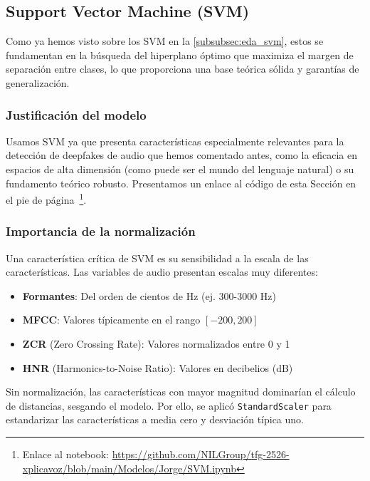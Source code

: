 \subsection{Support Vector Machine (SVM)}
\label{subsubsec:mod_svm}

Como ya hemos visto sobre los SVM en la \autoref{subsubsec:eda_svm}, estos se fundamentan en la búsqueda del hiperplano óptimo que maximiza el margen de separación entre clases, lo que proporciona una base teórica sólida y garantías de generalización.

\subsubsection*{Justificación del modelo}

Usamos SVM ya que presenta características especialmente relevantes para la detección de deepfakes de audio que hemos comentado antes, como la eficacia en espacios de alta dimensión (como puede ser el mundo del lenguaje natural) o su fundamento teórico robusto. Presentamos un enlace al código de esta Sección en el pie de página~\footnote{Enlace al notebook: \url{https://github.com/NILGroup/tfg-2526-xplicavoz/blob/main/Modelos/Jorge/SVM.ipynb}}.

\subsubsection*{Importancia de la normalización}

Una característica crítica de SVM es su sensibilidad a la escala de las características. Las variables de audio presentan escalas muy diferentes:

\begin{itemize}
    \item \textbf{Formantes}: Del orden de cientos de Hz (ej. 300-3000 Hz)
    \item \textbf{MFCC}: Valores típicamente en el rango \([-200, 200]\)
    \item \textbf{ZCR} (Zero Crossing Rate): Valores normalizados entre 0 y 1
    \item \textbf{HNR} (Harmonics-to-Noise Ratio): Valores en decibelios (dB)
\end{itemize}

Sin normalización, las características con mayor magnitud dominarían el cálculo de distancias, sesgando el modelo. Por ello, se aplicó \texttt{StandardScaler} para estandarizar las características a media cero y desviación típica uno.

